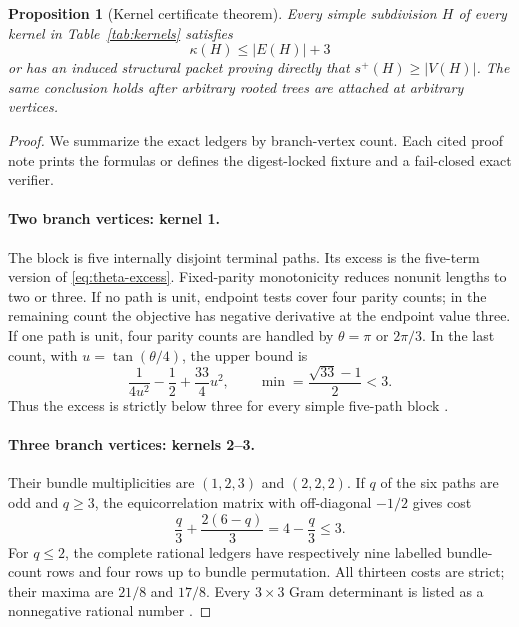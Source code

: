 \documentclass[11pt]{article}
\newtheorem{proposition}[theorem]{Proposition}
\theoremstyle{remark}
\newcommand{\splus}{s^+}
\newcommand{\kap}{\kappa}
\begin{document}
\begin{proposition}[Kernel certificate theorem]\label{prop:kernel-cert}
Every simple subdivision $H$ of every kernel in Table~\ref{tab:kernels}
satisfies
\[
 \kap(H)\leq|E(H)|+3
\]
or has an induced structural packet proving directly that
$\splus(H)\geq|V(H)|$.  The same conclusion holds after arbitrary rooted trees
are attached at arbitrary vertices.
\end{proposition}

\begin{proof}
We summarize the exact ledgers by branch-vertex count.  Each cited proof note
prints the formulas or defines the digest-locked fixture and a fail-closed
exact verifier.

\paragraph{Two branch vertices: kernel 1.}
The block is five internally disjoint terminal paths.  Its excess is the
five-term version of \eqref{eq:theta-excess}.  Fixed-parity monotonicity reduces
nonunit lengths to two or three.  If no path is unit, endpoint tests cover
four parity counts; in the remaining count the objective has negative
derivative at the endpoint value three.  If one path is unit, four parity
counts are handled by $\theta=\pi$ or $2\pi/3$.  In the last count, with
$u=\tan(\theta/4)$, the upper bound is
\[
 \frac1{4u^2}-\frac12+\frac{33}{4}u^2,
 \qquad \min=\frac{\sqrt{33}-1}{2}<3.
\]
Thus the excess is strictly below three for every simple five-path block
\cite{FivePath}.

\paragraph{Three branch vertices: kernels 2--3.}
Their bundle multiplicities are $(1,2,3)$ and $(2,2,2)$.  If $q$ of the six
paths are odd and $q\geq3$, the equicorrelation matrix with off-diagonal
$-1/2$ gives cost
\[
 \frac q3+\frac{2(6-q)}3=4-\frac q3\leq3.
\]
For $q\leq2$, the complete rational ledgers have respectively nine labelled
bundle-count rows and four rows up to bundle permutation.  All thirteen costs
are strict; their maxima are $21/8$ and $17/8$.  Every $3\times3$ Gram
determinant is listed as a nonnegative rational number \cite{ThreeVertex}.


\end{proof}
\end{document}
